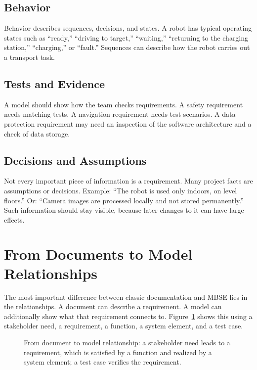 \subsection{Behavior}
Behavior describes sequences, decisions, and states. A robot has typical operating states such as \enquote{ready,} \enquote{driving to target,} \enquote{waiting,} \enquote{returning to the charging station,} \enquote{charging,} or \enquote{fault.} Sequences can describe how the robot carries out a transport task.

\subsection{Tests and Evidence}
A model should show how the team checks requirements. A safety requirement needs matching tests. A navigation requirement needs test scenarios. A data protection requirement may need an inspection of the software architecture and a check of data storage.

\subsection{Decisions and Assumptions}
Not every important piece of information is a requirement. Many project facts are assumptions or decisions. Example: \enquote{The robot is used only indoors, on level floors.} Or: \enquote{Camera images are processed locally and not stored permanently.} Such information should stay visible, because later changes to it can have large effects.

\section{From Documents to Model Relationships}
The most important difference between classic documentation and MBSE lies in the relationships. A document can describe a requirement. A model can additionally show what that requirement connects to. Figure~\ref{fig:kap02-dokumente-modellbeziehungen} shows this using a stakeholder need, a requirement, a function, a system element, and a test case.

\begin{figure}[H]
  \centering
  \caption{From document to model relationship: a stakeholder need leads to a requirement, which is satisfied by a function and realized by a system element; a test case verifies the requirement.}
  \label{fig:kap02-dokumente-modellbeziehungen}
\end{figure}


